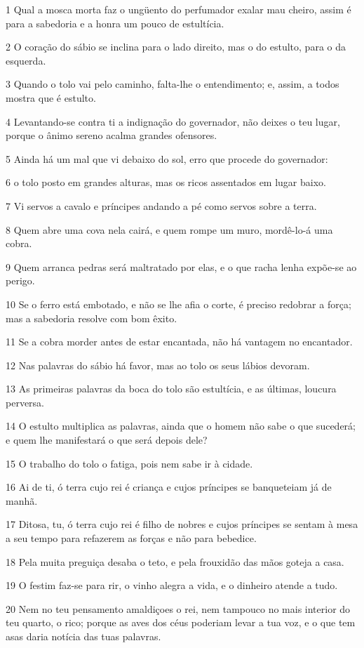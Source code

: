\par 1 Qual a mosca morta faz o ungüento do perfumador exalar mau cheiro, assim é para a sabedoria e a honra um pouco de estultícia.
\par 2 O coração do sábio se inclina para o lado direito, mas o do estulto, para o da esquerda.
\par 3 Quando o tolo vai pelo caminho, falta-lhe o entendimento; e, assim, a todos mostra que é estulto.
\par 4 Levantando-se contra ti a indignação do governador, não deixes o teu lugar, porque o ânimo sereno acalma grandes ofensores.
\par 5 Ainda há um mal que vi debaixo do sol, erro que procede do governador:
\par 6 o tolo posto em grandes alturas, mas os ricos assentados em lugar baixo.
\par 7 Vi servos a cavalo e príncipes andando a pé como servos sobre a terra.
\par 8 Quem abre uma cova nela cairá, e quem rompe um muro, mordê-lo-á uma cobra.
\par 9 Quem arranca pedras será maltratado por elas, e o que racha lenha expõe-se ao perigo.
\par 10 Se o ferro está embotado, e não se lhe afia o corte, é preciso redobrar a força; mas a sabedoria resolve com bom êxito.
\par 11 Se a cobra morder antes de estar encantada, não há vantagem no encantador.
\par 12 Nas palavras do sábio há favor, mas ao tolo os seus lábios devoram.
\par 13 As primeiras palavras da boca do tolo são estultícia, e as últimas, loucura perversa.
\par 14 O estulto multiplica as palavras, ainda que o homem não sabe o que sucederá; e quem lhe manifestará o que será depois dele?
\par 15 O trabalho do tolo o fatiga, pois nem sabe ir à cidade.
\par 16 Ai de ti, ó terra cujo rei é criança e cujos príncipes se banqueteiam já de manhã.
\par 17 Ditosa, tu, ó terra cujo rei é filho de nobres e cujos príncipes se sentam à mesa a seu tempo para refazerem as forças e não para bebedice.
\par 18 Pela muita preguiça desaba o teto, e pela frouxidão das mãos goteja a casa.
\par 19 O festim faz-se para rir, o vinho alegra a vida, e o dinheiro atende a tudo.
\par 20 Nem no teu pensamento amaldiçoes o rei, nem tampouco no mais interior do teu quarto, o rico; porque as aves dos céus poderiam levar a tua voz, e o que tem asas daria notícia das tuas palavras.

